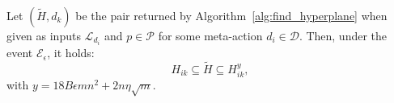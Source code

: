 \begin{lemma}\label{lem:diff_cost_hyperplane}
	Let $(\widetilde{H},d_k)$ be the pair returned by Algorithm~\ref{alg:find_hyperplane} when given as inputs $\mathcal{L}_{d_i}$ and $p \in \mathcal{P}$ for some meta-action $d_i \in \mathcal{D}$.
	Then, under the event $\mathcal{E}_\epsilon$, it holds:
	\begin{equation*}
	   H_{ik}\subseteq \widetilde H \subseteq H_{ik}^y,
	 \end{equation*}
	 with $y=18 B \epsilon m n^2 + 2  n \eta \sqrt{m}$.
\end{lemma}
	
